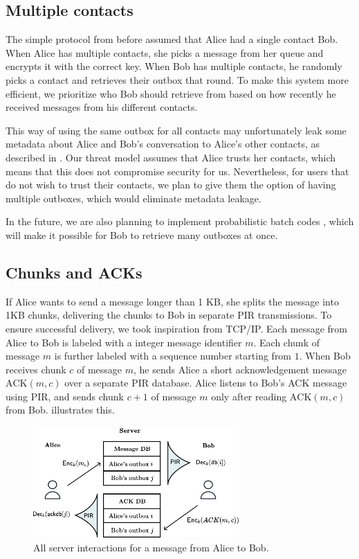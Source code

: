 \subsection{Multiple contacts}

The simple protocol from before assumed that Alice had a single contact Bob. When Alice has multiple contacts, she picks a message from her queue and encrypts it with the correct key. When Bob has multiple contacts, he randomly picks a contact and retrieves their outbox that round. To make this system more efficient, we prioritize who Bob should retrieve from based on how recently he received messages from his different contacts. 

This way of using the same outbox for all contacts may unfortunately leak some metadata about Alice and Bob's conversation to Alice's other contacts, as described in \cite{angel2018s}. Our threat model assumes that Alice trusts her contacts, which means that this does not compromise security for us. Nevertheless, for users that do not wish to trust their contacts, we plan to give them the option of having multiple outboxes, which would eliminate metadata leakage.

In the future, we are also planning to implement probabilistic batch codes \cite{angel2018pir}, which will make it possible for Bob to retrieve many outboxes at once.

\subsection{Chunks and ACKs}

If Alice wants to send a message longer than 1 KB, she splits the message into 1KB chunks, delivering the chunks to Bob in separate PIR transmissions. To ensure successful delivery, we took inspiration from TCP/IP. Each message from Alice to Bob is labeled with a integer message identifier $m$. Each chunk of message $m$ is further labeled with a sequence number starting from $1$. When Bob receives chunk $c$ of message $m$, he sends Alice a short acknowledgement message $\text{ACK}(m, c)$ over a separate PIR database. Alice listens to Bob's ACK message using PIR, and sends chunk $c + 1$ of message $m$ only after reading $\text{ACK}(m, c)$ from Bob.  illustrates this.

\begin{figure}
    \centering
    \includegraphics[width=0.7\textwidth]{ACK.pdf}
\caption{All server interactions for a message from Alice to Bob. }
\label{fig:pirandacks}
\end{figure}


